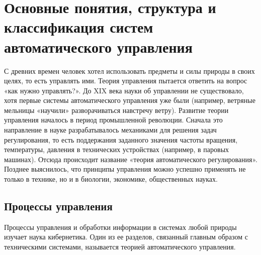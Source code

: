 \documentclass[../../TAU.tex]{subfiles}
\begin{document}
\chapter{Основные понятия, структура и классификация систем автоматического управления}

    С древних времен человек хотел использовать предметы и силы природы в своих целях, то есть управлять ими. Теория управления пытается ответить на вопрос «как нужно управлять?». До XIX века науки об управлении не существовало, хотя первые системы автоматического управления уже были (например, ветряные мельницы «научили» разворачиваться навстречу ветру). Развитие теории управления началось в период промышленной революции. Сначала это направление в науке разрабатывалось механиками для решения задач регулирования, то есть поддержания заданного значения частоты вращения, температуры, давления в технических устройствах (например, в паровых машинах). Отсюда происходит название «теория автоматического регулирования». Позднее выяснилось, что принципы управления можно успешно применять не только в технике, но и в биологии, экономике, общественных науках.

\section {Процессы управления}

    Процессы управления и обработки информации в системах любой природы изучает наука кибернетика. Один из ее разделов, связанный главным образом с техническими системами, называется теорией автоматического управления. 
\end{document}
